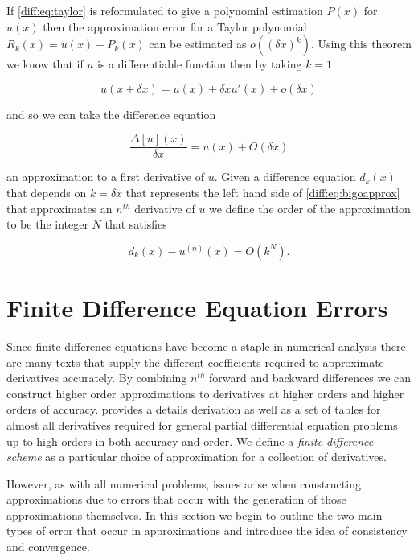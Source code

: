 \documentclass[../main.tex]{subfiles}
\begin{document}
  If \autoref{diff:eq:taylor} is reformulated to give a polynomial estimation $P(x)$ for $u(x)$ then the approximation error for a Taylor polynomial $R_k(x) = u(x) - P_k(x)$ can be estimated as $o((\delta x)^k)$. Using this theorem we know that if $u$ is a differentiable function then by taking $k = 1$

  \begin{equation}
    u(x + \delta x) = u(x) + \delta x u'(x) + o(\delta x)
  \end{equation}

  and so we can take the difference equation

  \begin{equation} \label{diff:eq:bigoapprox}
    \frac{\Delta[u](x)}{\delta x} = u(x) + O(\delta x)
  \end{equation}

  an approximation to a first derivative of $u$. Given a difference equation $d_k(x)$ that depends on $k = \delta x$ that represents the left hand side of \autoref{diff:eq:bigoapprox} that approximates an $n^{th}$ derivative of $u$ we define the order of the approximation to be the integer $N$ that satisfies

  \begin{equation}
    d_k(x) - u^{(n)}(x) = O(k^N).
  \end{equation}

  \section{Finite Difference Equation Errors}
  Since finite difference equations have become a staple in numerical analysis there are many texts that supply the different coefficients required to approximate derivatives accurately. By combining $n^{th}$ forward and backward differences we can construct higher order approximations to derivatives at higher orders and higher orders of accuracy. \cite{fornberg1988} provides a details derivation as well as a set of tables for almost all derivatives required for general partial differential equation problems up to high orders in both accuracy and order. We define a \emph{finite difference scheme} as a particular choice of approximation for a collection of derivatives.

  However, as with all numerical problems, issues arise when constructing approximations due to errors that occur with the generation of those approximations themselves. In this section we begin to outline the two main types of error that occur in approximations and introduce the idea of consistency and convergence.
\end{document}
